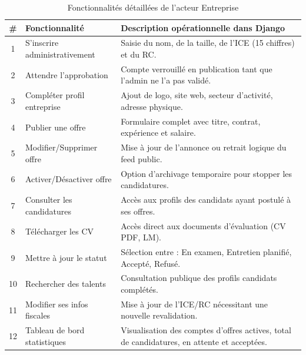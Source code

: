 \begin{table}[H]
\centering
\small
\begin{tabularx}{\textwidth}{c >{\raggedright\arraybackslash}p{4cm} >{\raggedright\arraybackslash}X}
\toprule
\textbf{\#} & \textbf{Fonctionnalité} & \textbf{Description opérationnelle dans Django} \\
\midrule
1 & S'inscrire administrativement & Saisie du nom, de la taille, de l'ICE (15 chiffres) et du RC. \\
2 & Attendre l'approbation & Compte verrouillé en publication tant que l'admin ne l'a pas validé. \\
3 & Compléter profil entreprise & Ajout de logo, site web, secteur d'activité, adresse physique. \\
4 & Publier une offre & Formulaire complet avec titre, contrat, expérience et salaire. \\
5 & Modifier/Supprimer offre & Mise à jour de l'annonce ou retrait logique du feed public. \\
6 & Activer/Désactiver offre & Option d'archivage temporaire pour stopper les candidatures. \\
7 & Consulter les candidatures & Accès aux profils des candidats ayant postulé à ses offres. \\
8 & Télécharger les CV & Accès direct aux documents d'évaluation (CV PDF, LM). \\
9 & Mettre à jour le statut & Sélection entre : En examen, Entretien planifié, Accepté, Refusé. \\
10 & Rechercher des talents & Consultation publique des profils candidats complétés. \\
11 & Modifier ses infos fiscales & Mise à jour de l'ICE/RC nécessitant une nouvelle revalidation. \\
12 & Tableau de bord statistiques & Visualisation des comptes d'offres actives, total de candidatures, en attente et acceptées. \\
\bottomrule
\end{tabularx}
\caption{Fonctionnalités détaillées de l'acteur Entreprise}
\label{tab:features_entreprise}
\end{table}


